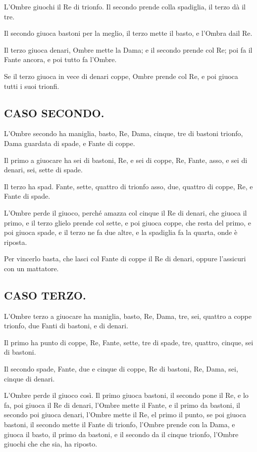 \documentclass[11pt,a6paper]{article}
\begin{document}
L'Ombre giuochi il Re di trionfo. Il secondo
prende colla spadiglia, il terzo dà il
tre.

Il secondo giuoca bastoni per la meglio,
il terzo mette il basto, e l'Ombra dail Re.

Il terzo giuoca denari, Ombre mette la
Dama; e il secondo prende col Re; poi fa il
Fante ancora, e poi tutto fa l'Ombre.

Se il terzo giuoca in vece di denari coppe,
Ombre prende col Re, e poi giuoca
tutti i suoi trionfi.

\subsection{CASO SECONDO.}

L'Ombre secondo ha maniglia, basto, Re,
Dama, cinque, tre di bastoni trionfo,
Dama guardata di spade, e Fante di coppe.

Il primo a giuocare ha sei di bastoni,
Re, e sei di coppe, Re, Fante, asso, e sei
di denari, sei, sette di spade.

Il terzo ha spad. Fante, sette, quattro di
trionfo asso, due, quattro di coppe, Re,
e Fante di spade.

L'Ombre perde il giuoco, perché amazza
col cinque il Re di denari, che giuoca il
primo, e il terzo glielo prende col sette, e
poi giuoca coppe, che resta del primo, e poi
giuoca spade, e il terzo ne fa due altre, e la
spadiglia fa la quarta, onde è riposta.

Per vincerlo basta, che lasci col Fante di
coppe il Re di denari, oppure l'assicuri con
un mattatore.

\subsection{CASO TERZO.}
L'Ombre terzo a giuocare ha maniglia,
basto, Re, Dama, tre, sei, quattro a
coppe trionfo, due Fanti di bastoni, e di denari.

Il primo ha punto di coppe, Re, Fante,
sette, tre di spade, tre, quattro, cinque, sei
di bastoni.

Il secondo spade, Fante, due e cinque
di coppe, Re di bastoni, Re, Dama, sei,
cinque di denari.

L'Ombre perde il giuoco così. Il primo
giuoca bastoni, il secondo pone il Re, e lo fa,
poi giuoca il Re di denari, l'Ombre mette il
Fante, e il primo da bastoni, il secondo poi
giuoca denari, l'Ombre mette il Re, el primo
il punto, se poi giuoca bastoni, il secondo
mette il Fante di trionfo, l'Ombre prende
con la Dama, e giuoca il basto, il primo da
bastoni, e il secondo da il cinque trionfo,
l'Ombre giuochi che che sia, ha riposto.
\end{document}
